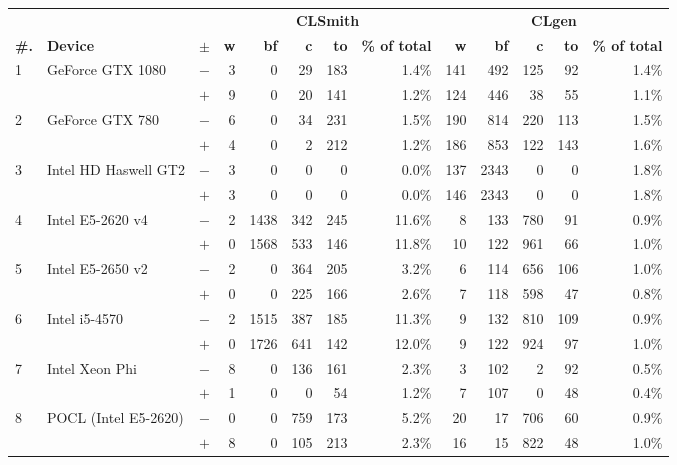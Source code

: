   \begin{tabular}{lll | rrrrr | rrrrr }
  \toprule
  & & & \multicolumn{5}{c|}{\textbf{CLSmith}} & \multicolumn{5}{c}{\textbf{CLgen}} \\
  \textbf{\#.} & \textbf{Device} & $\pm$ &
  \textbf{w} & \textbf{bf} & \textbf{c} & \textbf{to} & \textbf{\% of total} &
  \textbf{w} & \textbf{bf} & \textbf{c} & \textbf{to} & \textbf{\% of total} \\
  \midrule
  \multirow{ 2}{*}{1} & \multirow{ 2}{*}{GeForce GTX 1080} & $-$ & 3 & 0 & 29 & 183 & 1.4\%       & 141 & 492 & 125 & 92 & 1.4\% \\& & $+$ & 9 & 0 & 20 & 141 & 1.2\% & 124 & 446 & 38 & 55 & 1.1\% \\
\hline
\multirow{ 2}{*}{2} & \multirow{ 2}{*}{GeForce GTX 780} & $-$ & 6 & 0 & 34 & 231 & 1.5\%       & 190 & 814 & 220 & 113 & 1.5\% \\& & $+$ & 4 & 0 & 2 & 212 & 1.2\% & 186 & 853 & 122 & 143 & 1.6\% \\
\hline
\multirow{ 2}{*}{3} & \multirow{ 2}{*}{Intel HD Haswell GT2} & $-$ & 3 & 0 & 0 & 0 & 0.0\%       & 137 & 2343 & 0 & 0 & 1.8\% \\& & $+$ & 3 & 0 & 0 & 0 & 0.0\% & 146 & 2343 & 0 & 0 & 1.8\% \\
\hline
\multirow{ 2}{*}{4} & \multirow{ 2}{*}{Intel E5-2620 v4} & $-$ & 2 & 1438 & 342 & 245 & 11.6\%       & 8 & 133 & 780 & 91 & 0.9\% \\& & $+$ & 0 & 1568 & 533 & 146 & 11.8\% & 10 & 122 & 961 & 66 & 1.0\% \\
\hline
\multirow{ 2}{*}{5} & \multirow{ 2}{*}{Intel E5-2650 v2} & $-$ & 2 & 0 & 364 & 205 & 3.2\%       & 6 & 114 & 656 & 106 & 1.0\% \\& & $+$ & 0 & 0 & 225 & 166 & 2.6\% & 7 & 118 & 598 & 47 & 0.8\% \\
\hline
\multirow{ 2}{*}{6} & \multirow{ 2}{*}{Intel i5-4570} & $-$ & 2 & 1515 & 387 & 185 & 11.3\%       & 9 & 132 & 810 & 109 & 0.9\% \\& & $+$ & 0 & 1726 & 641 & 142 & 12.0\% & 9 & 122 & 924 & 97 & 1.0\% \\
\hline
\multirow{ 2}{*}{7} & \multirow{ 2}{*}{Intel Xeon Phi} & $-$ & 8 & 0 & 136 & 161 & 2.3\%       & 3 & 102 & 2 & 92 & 0.5\% \\& & $+$ & 1 & 0 & 0 & 54 & 1.2\% & 7 & 107 & 0 & 48 & 0.4\% \\
\hline
\multirow{ 2}{*}{8} & \multirow{ 2}{*}{POCL (Intel E5-2620)} & $-$ & 0 & 0 & 759 & 173 & 5.2\%       & 20 & 17 & 706 & 60 & 0.9\% \\& & $+$ & 8 & 0 & 105 & 213 & 2.3\% & 16 & 15 & 822 & 48 & 1.0\% \\

\end{tabular}
